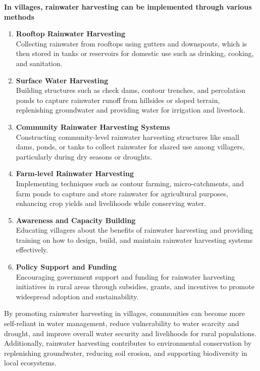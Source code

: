 \documentclass[12pt]{article}
\begin{document}
	\noindent \textbf{In villages, rainwater harvesting can be implemented through various methods}
	\begin{enumerate}[label=\textbf{\arabic*.}]
		\item \textbf{Rooftop Rainwater Harvesting} \\
		Collecting rainwater from rooftops using gutters and downspouts, which is then stored in tanks or reservoirs for domestic use such as drinking, cooking, and sanitation.

		\item \textbf{Surface Water Harvesting} \\
		Building structures such as check dams, contour trenches, and percolation ponds to capture rainwater runoff from hillsides or sloped terrain, replenishing groundwater and providing water for irrigation and livestock.

		\item \textbf{Community Rainwater Harvesting Systems} \\
		Constructing community-level rainwater harvesting structures like small dams, ponds, or tanks to collect rainwater for shared use among villagers, particularly during dry seasons or droughts.

		\item \textbf{Farm-level Rainwater Harvesting} \\
		Implementing techniques such as contour farming, micro-catchments, and farm ponds to capture and store rainwater for agricultural purposes, enhancing crop yields and livelihoods while conserving water.
		 \newpage
		\item \textbf{Awareness and Capacity Building} \\
		Educating villagers about the benefits of rainwater harvesting and providing training on how to design, build, and maintain rainwater harvesting systems effectively.

		\item \textbf{Policy Support and Funding} \\
		Encouraging government support and funding for rainwater harvesting initiatives in rural areas through subsidies, grants, and incentives to promote widespread adoption and sustainability.
	\end{enumerate}

	\par By promoting rainwater harvesting in villages, communities can become more self-reliant in water management, reduce vulnerability to water scarcity and drought, and improve overall water security and livelihoods for rural populations. Additionally, rainwater harvesting contributes to environmental conservation by replenishing groundwater, reducing soil erosion, and supporting biodiversity in local ecosystems.
\end{document}
